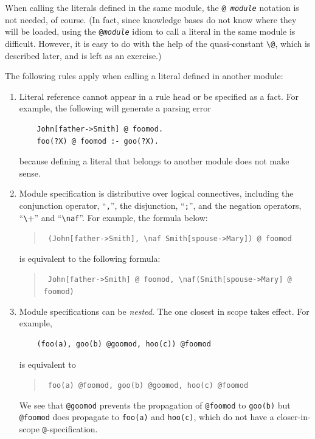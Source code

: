 \documentclass[11pt]{article}
\makeatletter
\newcommand{\thismodule}{{\tt \bs{}@}\xspace}
\newcommand{\bs}{\textbackslash}
\newcommand{\PLGNAF}{\mbox{\texttt{\bs}+}\xspace}
\newcommand{\RULELOGNAF}{{\texttt{{\bs}naf}}\xspace}
\makeatother
\begin{document}
When calling the literals defined in the same module, the {\tt @{\it
    module}} notation is not needed, of course. (In fact, since knowledge
bases
do not know where they will be loaded, using the \texttt{@\textit{module}}   idiom to call a
literal in the same module is difficult. However, it is easy to do with the help
of the quasi-constant \thismodule, which is described later, and is left
as an exercise.)

The following rules apply when calling a literal defined in another module:
\begin{enumerate}
\item Literal reference cannot appear in a rule head or be specified as
  a fact. For example, the following will generate
  a parsing error
  \begin{verbatim}
    John[father->Smith] @ foomod.
    foo(?X) @ foomod :- goo(?X).
  \end{verbatim}
  because defining a literal that belongs to another module does not make
  sense.
  
\item Module specification is distributive over logical connectives,
  including the conjunction operator, ``\verb|,|'', the disjunction,
  ``\verb|;|'', and the negation operators, ``\PLGNAF'' and
  ``\RULELOGNAF''. For example, the formula below:
  \begin{quote}
    {\tt
    (John[father->Smith], \RULELOGNAF Smith[spouse->Mary]) @ foomod
    }
  \end{quote}
  is equivalent to the following formula:
  \begin{quote}
    {\tt
    John[father->Smith] @ foomod, \RULELOGNAF (Smith[spouse->Mary] @ foomod)
    }
  \end{quote}

\item Module specifications can be \emph{nested}. The one closest in scope
  takes effect. For example,
  \label{pg-nested-module}
  \begin{verbatim}
    (foo(a), goo(b) @goomod, hoo(c)) @foomod
  \end{verbatim}
  is equivalent to
  \begin{quote}
    {\tt
      foo(a) @foomod, goo(b) @goomod, hoo(c) @foomod
    }
  \end{quote}
  We see that \texttt{@goomod} prevents the propagation of \texttt{@foomod}
  to \texttt{goo(b)} but \texttt{@foomod} does propagate to \texttt{foo(a)}
  and \texttt{hoo(c)}, which do not have a closer-in-scope
  \texttt{@}-specification.
  

\end{enumerate}
\end{document}
